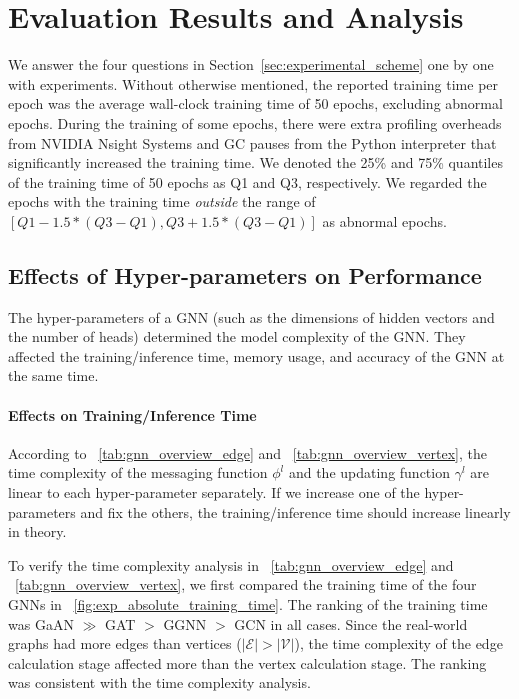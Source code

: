 \section{Evaluation Results and Analysis}
\label{sec:experiment_results}

We answer the four questions in Section~\ref{sec:experimental_scheme} one by one with experiments.
%
Without otherwise mentioned, the reported training time per epoch was the average wall-clock training time of 50 epochs, excluding abnormal epochs.
%
During the training of some epochs, there were extra profiling overheads from NVIDIA Nsight Systems and GC pauses from the Python interpreter that significantly increased the training time.
%
We denoted the 25\% and 75\% quantiles of the training time of 50 epochs as Q1 and Q3, respectively.
%
We regarded the epochs with the training time \emph{outside} the range of $[Q1 - 1.5 * (Q3-Q1), Q3 + 1.5 * (Q3-Q1)]$ as abnormal epochs.

\subsection{Effects of Hyper-parameters on Performance}
\label{sec:effects_of_hyper-parameters_on_performance}

The hyper-parameters of a GNN (such as the dimensions of hidden vectors and the number of heads) determined the model complexity of the GNN.
%
They affected the training/inference time, memory usage, and accuracy of the GNN at the same time.


\paragraph{Effects on Training/Inference Time}

According to \tablename~\ref{tab:gnn_overview_edge} and \tablename~\ref{tab:gnn_overview_vertex}, the time complexity of the messaging function $\phi^l$ and the updating function $\gamma^l$ are linear to each hyper-parameter separately.
%
If we increase one of the hyper-parameters and fix the others, the training/inference time should increase linearly in theory.

To verify the time complexity analysis in \tablename~\ref{tab:gnn_overview_edge} and \tablename~\ref{tab:gnn_overview_vertex}, we first compared the training time of the four GNNs in \figurename~\ref{fig:exp_absolute_training_time}.
%
The ranking of the training time was GaAN $\gg$ GAT $>$ GGNN $>$ GCN in all cases.
%
Since the real-world graphs had more edges than vertices ($|\mathcal{E}| > |\mathcal{V}|$), the time complexity of the edge calculation stage affected more than the vertex calculation stage.
%
The ranking was consistent with the time complexity analysis.

